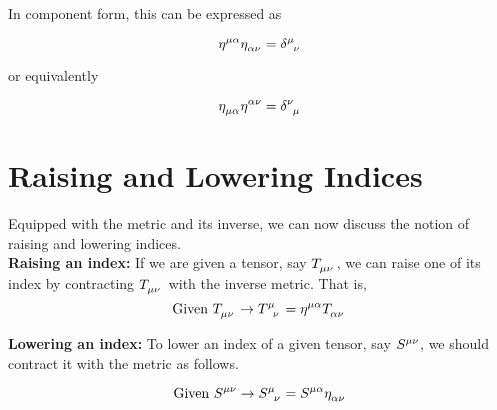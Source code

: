 \documentclass[11pt]{article}
\begin{document}
In component form, this can be expressed as

\begin{equation}
\tensor{\eta}{^\mu^\alpha}\tensor{\eta}{_\alpha_\nu}=\tensor{\delta}{^\mu_\nu}\label{inverse1}
\end{equation}

or equivalently

\begin{equation}
\tensor{\eta}{_\mu_\alpha}\tensor{\eta}{^\alpha^\nu}=\tensor{\delta}{^\nu_\mu}\label{inverse2}
\end{equation}

\section{Raising and Lowering Indices}

Equipped with the metric and its inverse, we can now discuss the notion of raising and lowering indices.\\

\noindent \textbf{Raising an index:} If we are given a tensor, say $\tensor{T}{_\mu_\nu}$, we can raise one of its index by contracting $\tensor{T}{_\mu_\nu}$ with the inverse metric. That is,
\begin{equation}
\text{Given }\tensor{T} {_\mu_\nu} \rightarrow \tensor{T} {^\mu_\nu}=\tensor{\eta}{^\mu^\alpha}\tensor{T}{_\alpha_\nu}
\end{equation}

\noindent \textbf{Lowering an index:} To lower an index of a given tensor, say $\tensor{S}{^\mu^\nu}$, we should contract it with the metric as follows.

\begin{equation}
\text{Given }\tensor{S} {^\mu^\nu} \rightarrow \tensor{S} {^\mu_\nu}=\tensor{S}{^\mu^\alpha}\tensor{\eta}{_\alpha_\nu}
\end{equation}
\end{document}
